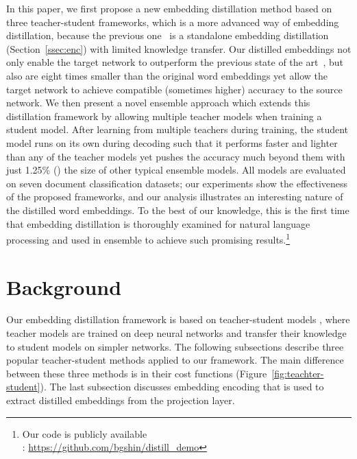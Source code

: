 \documentclass{article}
\begin{document}
In this paper, we first propose a new embedding distillation method based on three teacher-student frameworks, which is a more advanced way of embedding distillation, because the previous one~\cite{mou2016distilling} is a standalone embedding distillation (Section~\ref{ssec:enc}) with limited knowledge transfer. Our distilled embeddings not only enable the target network to outperform the previous state of the art~\cite{mou2016distilling}, but also are eight times smaller than the original word embeddings yet allow the target network to achieve compatible (sometimes higher) accuracy to the source network.
We then present a novel ensemble approach which extends this distillation framework by allowing multiple teacher models when training a student model. After learning from multiple teachers during training, the student model runs on its own during decoding such that it performs faster and lighter than any of the teacher models yet pushes the accuracy much beyond them with just 1.25\% () the size of other typical ensemble models. All models are evaluated on seven document classification datasets; our experiments show the effectiveness of the proposed frameworks, and our analysis illustrates an interesting nature of the distilled word embeddings.
To the best of our knowledge, this is the first time that embedding distillation is thoroughly examined for natural language processing and used in ensemble to achieve such promising results.\footnote{Our code is publicly available\\: \url{https://github.com/bgshin/distill_demo}}






%
 
\section{Background}
\label{sec:background}
\vspace{-0.5ex}
Our embedding distillation framework is based on teacher-student models \cite{ba2014deep,sau2016deep,hinton2015distilling}, where teacher models are trained on deep neural networks and transfer their knowledge to student models on simpler networks.
The following subsections describe three popular teacher-student methods applied to our framework.
The main difference between these three methods is in their cost functions (Figure~\ref{fig:teachter-student}).
The last subsection discusses embedding encoding that is used to extract distilled embeddings from the projection layer.
\end{document}
